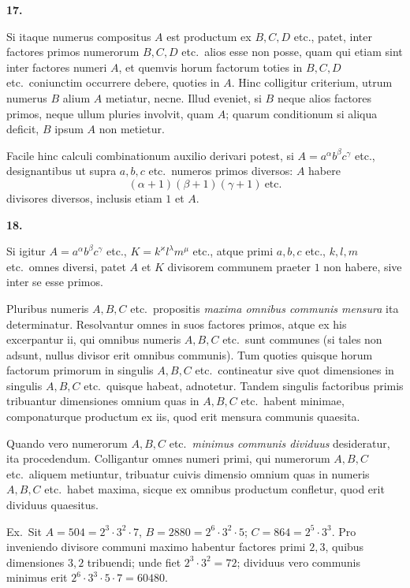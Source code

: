 \documentclass[12pt,a4paper]{article}
\theoremstyle{plain}
\theoremstyle{definition}
\theoremstyle{remark}
\begin{document}
\textbf{17.}

Si itaque numerus compositus $A$ est productum ex $B, C, D$ etc., patet, inter factores primos numerorum $B, C, D$ etc.\ alios esse non posse, quam qui etiam sint inter factores numeri $A$, et quemvis horum factorum toties in $B, C, D$ etc.\ coniunctim occurrere debere, quoties in $A$. Hinc colligitur criterium, utrum numerus $B$ alium $A$ metiatur, necne. Illud eveniet, si $B$ neque alios factores primos, neque ullum pluries involvit, quam $A$; quarum conditionum si aliqua deficit, $B$ ipsum $A$ non metietur.

Facile hinc calculi combinationum auxilio derivari potest, si $A = a^\alpha b^\beta c^\gamma$ etc., designantibus ut supra $a, b, c$ etc.\ numeros primos diversos: $A$ habere
\[
(\alpha + 1)(\beta + 1)(\gamma + 1)\ \text{etc.}
\]
divisores diversos, inclusis etiam $1$ et $A$.

\textbf{18.}

Si igitur $A = a^\alpha b^\beta c^\gamma$ etc., $K = k^\varkappa l^\lambda m^\mu$ etc., atque primi $a, b, c$ etc., $k, l, m$ etc.\ omnes diversi, patet $A$ et $K$ divisorem communem praeter $1$ non habere, sive inter se esse primos.

Pluribus numeris $A, B, C$ etc.\ propositis \emph{maxima omnibus communis mensura} ita determinatur. Resolvantur omnes in suos factores primos, atque ex his excerpantur ii, qui omnibus numeris $A, B, C$ etc.\ sunt communes (si tales non adsunt, nullus divisor erit omnibus communis). Tum quoties quisque horum factorum primorum in singulis $A, B, C$ etc.\ contineatur sive quot dimensiones in singulis $A, B, C$ etc.\ quisque habeat, adnotetur. Tandem singulis factoribus primis tribuantur dimensiones omnium quas in $A, B, C$ etc.\ habent minimae, componaturque productum ex iis, quod erit mensura communis quaesita.

Quando vero numerorum $A, B, C$ etc.\ \emph{minimus communis dividuus} desideratur, ita procedendum. Colligantur omnes numeri primi, qui numerorum $A, B, C$ etc.\ aliquem metiuntur, tribuatur cuivis dimensio omnium quas in numeris $A, B, C$ etc.\ habet maxima, sicque ex omnibus productum confletur, quod erit dividuus quaesitus.

Ex.\ Sit $A = 504 = 2^3 \cdot 3^2 \cdot 7$, $B = 2880 = 2^6 \cdot 3^2 \cdot 5$; $C = 864 = 2^5 \cdot 3^3$. Pro inveniendo divisore communi maximo habentur factores primi $2, 3$, quibus dimensiones $3, 2$ tribuendi; unde fiet $2^3 \cdot 3^2 = 72$; dividuus vero communis minimus erit $2^6 \cdot 3^3 \cdot 5 \cdot 7 = 60480$.
\end{document}
